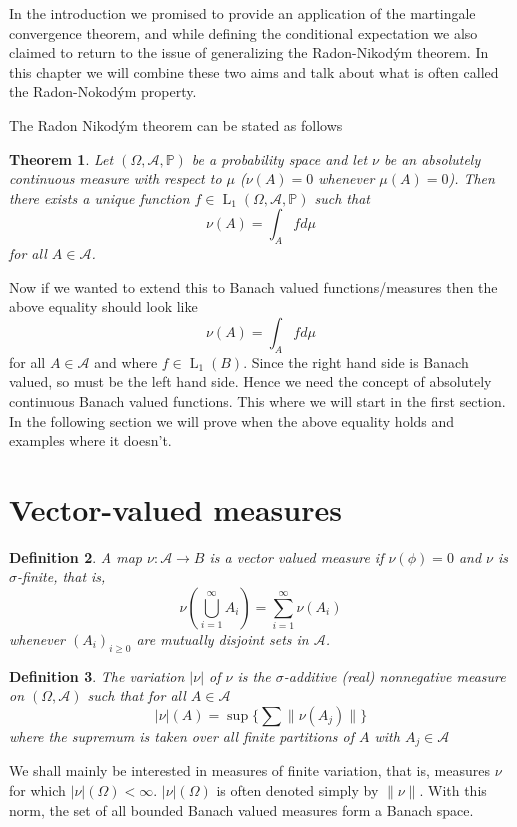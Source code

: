 \documentclass[]{report}
\newcommand{\lp}[2]{\operatorname{L}_{#1}({#2})}
\newcommand*{\Normu}[1]{\lVert {#1} \rVert}
\newcommand*{\Abs}[1]{\lvert {#1} \rvert}
\newcommand{\pspc}{\Omega,\mathcal{A},\mathbb{P}}
\newtheorem{theorem}{Theorem}[chapter]
\newtheorem{Def}[theorem]{Definition}
\begin{document}
In the introduction we promised to provide an application of the martingale convergence theorem, and while defining the conditional expectation we also claimed to return to the issue of generalizing the Radon-Nikod\'ym theorem. In this chapter we will combine these two aims and talk about what is often called the Radon-Nokod\'ym property. 

The Radon Nikod\'ym theorem can be stated as follows
\begin{theorem}\label{RN}
	Let $(\pspc)$ be a probability space and let $\nu$ be an absolutely continuous measure with respect to $\mu$ ($\nu(A)=0$ whenever $\mu(A)=0$). Then there exists a unique function $f \in \lp{1}{\pspc}$ such that 
	\[ \nu(A)= \int_{A}f d\mu \] for all $A \in \mathcal{A}$. 
\end{theorem}

Now if we wanted to extend this to Banach valued functions/measures then the above equality should look like
\[ \nu(A)= \int_{A}f d\mu \] for all $A \in \mathcal{A}$ and where $f \in \lp{1}{B}$. Since the right hand side is Banach valued, so must be the left hand side. Hence we need the concept of absolutely continuous Banach valued functions. This where we will start in the first section. In the following section we will prove when the above equality holds and examples where it doesn't.
\section{Vector-valued measures}
\begin{Def}
	A map $\nu : \mathcal{A}\rightarrow B$ is a vector valued measure if $\nu(\phi)=0$ and $\nu$ is $\sigma$-finite, that is,
	\[ \nu\left(\bigcup_{i=1}^{\infty} A_i \right)= \sum_{i=1}^{\infty}\nu(A_i) \] whenever $(A_i)_{i\geq 0}$ are mutually disjoint sets in $\mathcal{A}$.
\end{Def}

\begin{Def}
	The variation $\Abs{\nu}$ of $\nu$ is the $\sigma$-additive (real) nonnegative measure on $(\Omega,\mathcal{A})$ such that for all $A \in \mathcal{A}$
	\[ \Abs{\nu}(A)= \sup \{\sum \Normu{\nu(A_j)}\} \] where the supremum is taken over all finite partitions of $A$ with $A_j \in \mathcal{A}$
\end{Def}

We shall mainly be interested in measures of finite variation, that is, measures $\nu$ for which $\Abs{\nu}(\Omega)< \infty$. $\Abs{\nu}(\Omega)$ is often denoted simply by $\Normu{\nu}$. With this norm, the set of all bounded Banach valued measures form a Banach space. 
\end{document}
